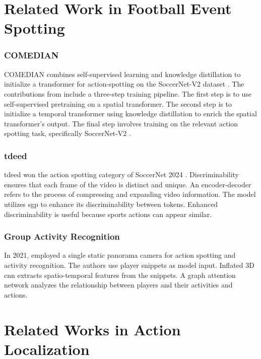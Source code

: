 \section{Related Work in Football Event Spotting}
\label{sec:fw_work}

\subsubsection{COMEDIAN}
COMEDIAN \cite{denize_comedian_2024} combines self-supervised learning and knowledge distillation to initialize a transformer for action-spotting on the SoccerNet-V2 dataset \cite{deliege_soccernet-v2_dataset_2021}. The contributions from \textcite{denize_comedian_2024} include a three-step training pipeline. The first step is to use self-supervised pretraining on a spatial transformer. The second step is to initialize a temporal transformer using knowledge distillation to enrich the spatial transformer's output. The final step involves training on the relevant action spotting task, specifically SoccerNet-V2 \cite{deliege_soccernet-v2_dataset_2021}.

\subsubsection{\acrfull{tdeed}}
\acrlong{tdeed} \cite{xarles_t-deed_2024} won the action spotting category of SoccerNet 2024 \cite{cioppa_soccernet_2024}. Discriminability ensures that each frame of the video is distinct and unique. An encoder-decoder refers to the process of compressing and expanding video information. The model utilizes \acrfull{sgp} to enhance its discriminability between tokens. Enhanced discriminability is useful because sports actions can appear similar. 

\subsubsection{Group Activity Recognition}

In 2021, \textcite{gerats_individual_same_task_2021} employed a single static panorama camera for action spotting and activity recognition. The authors use player snippets as model input. Inflated 3D \acrshort{cnn} extracts spatio-temporal features from the snippets. A graph attention network analyzes the relationship between players and their activities and actions.

\section{Related Works in Action Localization}
\label{sec:related_works_all}

